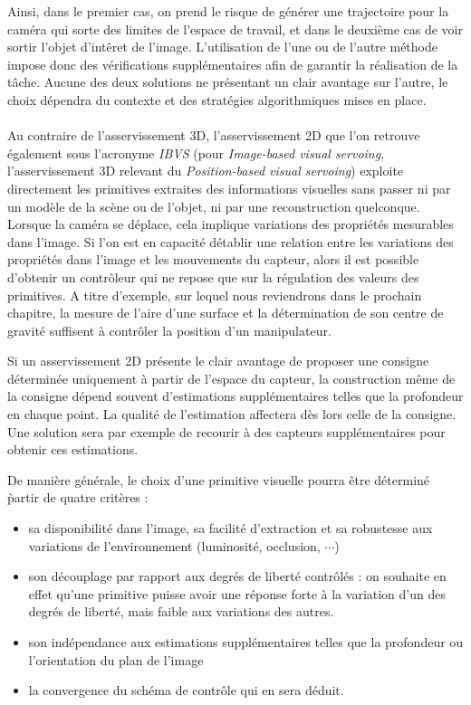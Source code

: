 Ainsi, dans le premier cas, on prend le risque de g\'en\'erer une trajectoire 
pour la cam\'era qui sorte des limites de l'espace de travail, et dans le 
deuxi\`eme cas de voir sortir l'objet d'int\^eret de l'image. L'utilisation de 
l'une ou de l'autre m\'ethode impose donc des v\'erifications suppl\'ementaires 
afin de garantir la r\'ealisation de la t\^ache. Aucune des deux solutions ne 
pr\'esentant un clair avantage sur l'autre, le choix d\'ependra du contexte et 
des strat\'egies algorithmiques mises en place.\\

 \\

Au contraire de l'asservissement 3D, l'asservissement 2D que l'on retrouve 
\'egalement sous l'acronyme {\it IBVS} (pour {\it Image-based visual servoing}, 
l'asser\-vissement 3D relevant du {\it Position-based visual servoing}) 
exploite directement les primitives extraites des informations visuelles sans 
passer ni par un mod\`ele de la sc\`ene ou de l'objet, ni par une reconstruction 
quelconque. Lorsque la cam\'era se d\'eplace, cela implique variations des 
propri\'et\'es mesurables dans l'image. Si l'on est en capacit\'e d\'etablir 
une relation entre les variations des propri\'et\'es dans l'image et les 
mouvements du capteur, alors il est possible d'obtenir un contr\^oleur qui ne 
repose que sur la r\'egulation des valeurs des primitives. A titre d'exemple, 
sur lequel nous reviendrons dans le prochain chapitre, la mesure de l'aire 
d'une surface et la d\'etermination de son centre de gravit\'e suffisent \`a 
contr\^oler la position d'un manipulateur.

Si un asservissement 2D pr\'esente le clair avantage de proposer une consigne 
d\'etermin\'ee uniquement \`a partir de l'espace du capteur, la construction 
m\^eme de la consigne d\'epend souvent d'estimations suppl\'ementaires telles 
que la profondeur en chaque point. La qualit\'e de l'estimation affectera d\`es 
lors celle de la consigne. Une solution sera par exemple de recourir \`a 
des capteurs suppl\'ementaires pour obtenir ces estimations. 

De mani\`ere g\'en\'erale, le choix d'une primitive visuelle pourra \^etre 
d\'etermin\'e \` partir de quatre crit\`eres :
\begin{itemize}
 \item sa disponibilit\'e dans l'image, sa facilit\'e d'extraction et sa 
robustesse aux variations de l'environnement (luminosit\'e, occlusion, $\cdots$)
  \item son d\'ecouplage par rapport aux degr\'es de libert\'e contr\^ol\'es : 
on souhaite en effet qu'une primitive puisse avoir une r\'eponse forte \`a la 
variation d'un des degr\'es de libert\'e, mais faible aux variations des autres.
  \item son ind\'ependance aux estimations suppl\'ementaires telles que la 
profondeur ou l'orientation du plan de l'image
  \item la convergence du sch\'ema de contr\^ole qui en sera d\'eduit.
\end{itemize}

